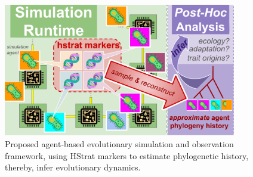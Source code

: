 \begin{figure}[htbp]
\centering
\includegraphics[width=4in]{img/runtime-posthoc-schematic.pdf}
\caption{Proposed agent-based evolutionary simulation and observation framework, using HStrat markers to estimate phylogenetic history, thereby, infer evolutionary dynamics.}
\label{fig:runtime-posthoc-schematic}
\end{figure}